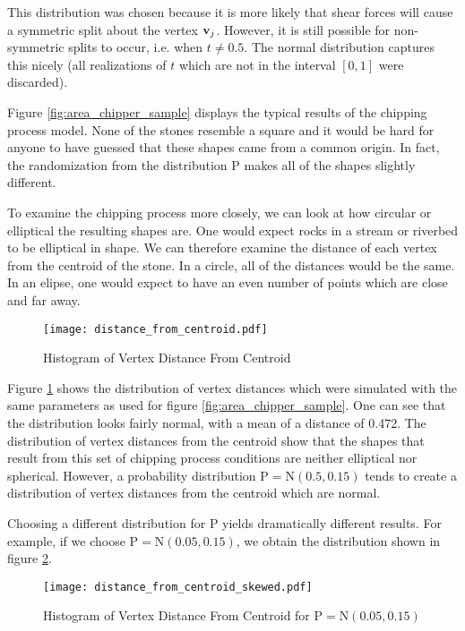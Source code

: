 This distribution was chosen because it is more likely that shear forces will cause a symmetric split about the vertex $\mathbf{v}_j$. However, it is still possible for non-symmetric splits to occur, i.e. when $t \neq 0.5$. The normal distribution captures this nicely (all realizations of $t$ which are not in the interval $[0,1]$ were discarded).

Figure \ref{fig:area_chipper_sample} displays the typical results of the chipping process model. None of the stones resemble a square and it would be hard for anyone to have guessed that these shapes came from a common origin. In fact, the randomization from the distribution $\mathrm{P}$ makes all of the shapes slightly different.

To examine the chipping process more closely, we can look at how circular or elliptical the resulting shapes are. One would expect rocks in a stream or riverbed to be elliptical in shape. We can therefore examine the distance of each vertex from the centroid of the stone. In a circle, all of the distances would be the same. In an elipse, one would expect to have an even number of points which are close and far away.

\begin{figure}
  \begin{center}
    \texttt{[image: distance\_from\_centroid.pdf]}
  \end{center}
  \caption{Histogram of Vertex Distance From Centroid \label{fig:distance_from_centroid}}
\end{figure}

Figure \ref{fig:distance_from_centroid} shows the distribution of vertex distances which were simulated with the same parameters as used for figure \ref{fig:area_chipper_sample}. One can see that the distribution looks fairly normal, with a mean of a distance of 0.472. The distribution of vertex distances from the centroid show that the shapes that result from this set of chipping process conditions are neither elliptical nor spherical. However, a probability distribution $\mathrm{P} = \mathrm{N}(0.5, 0.15)$ tends to create a distribution of vertex distances from the centroid which are normal.

Choosing a different distribution for $\mathrm{P}$ yields dramatically different results. For example, if we choose $\mathrm{P} = \mathrm{N}(0.05, 0.15)$, we obtain the distribution shown in figure \ref{fig:distance_from_centroid_skewed}.

\begin{figure}
  \begin{center}
    \texttt{[image: distance\_from\_centroid\_skewed.pdf]}
  \end{center}
  \caption{Histogram of Vertex Distance From Centroid for $\mathrm{P} = \mathrm{N}(0.05, 0.15)$ \label{fig:distance_from_centroid_skewed}}
\end{figure}

